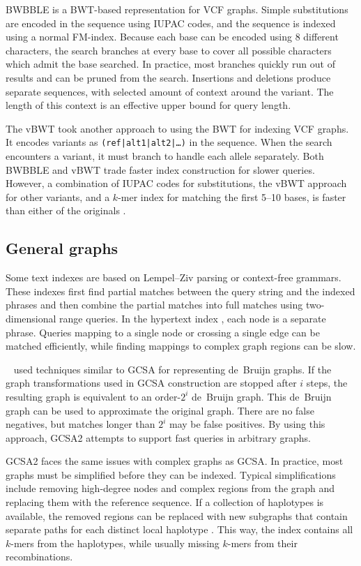 BWBBLE \cite{Huang_2013} is a BWT-based representation for VCF graphs.
Simple substitutions are encoded in the sequence using IUPAC codes, and the sequence is indexed using a normal FM-index.
Because each base can be encoded using 8 different characters, the search branches at every base to cover all possible characters which admit the base searched.
In practice, most branches quickly run out of results and can be pruned from the search.
Insertions and deletions produce separate sequences, with selected amount of context around the variant.
The length of this context is an effective upper bound for query length.

The vBWT \cite{Maciuca_2016} took another approach to using the BWT for indexing VCF graphs.
It encodes variants as \texttt{(ref|alt1|alt2|\dots)} in the sequence.
When the search encounters a variant, it must branch to handle each allele separately.
Both BWBBLE and vBWT trade faster index construction for slower queries.
However, a combination of IUPAC codes for substitutions, the vBWT approach for other variants, and a $k$-mer index for matching the first 5--10 bases, is faster than either of the originals \cite{Buechler_2019}.

\subsection{General graphs}

Some text indexes are based on Lempel--Ziv parsing or context-free grammars.
These indexes first find partial matches between the query string and the indexed phrases and then combine the partial matches into full matches using two-dimensional range queries.
In the hypertext index \cite{Thachuk_2013}, each node is a separate phrase.
Queries mapping to a single node or crossing a single edge can be matched efficiently, while finding mappings to complex graph regions can be slow.

\citeauthor{Bowe_2012}\ \cite{Bowe_2012} used techniques similar to GCSA for representing de~Bruijn graphs.
If the graph transformations used in GCSA construction are stopped after $i$ steps, the resulting graph is equivalent to an order-$2^{i}$ de~Bruijn graph.
This de~Bruijn graph can be used to approximate the original graph.
There are no false negatives, but matches longer than $2^{i}$ may be false positives.
By using this approach, GCSA2 \cite{Siren_2017} attempts to support fast queries in arbitrary graphs.

GCSA2 faces the same issues with complex graphs as GCSA.
In practice, most graphs must be simplified before they can be indexed.
Typical simplifications include removing high-degree nodes and complex regions from the graph and replacing them with the reference sequence.
If a collection of haplotypes is available, the removed regions can be replaced with new subgraphs that contain separate paths for each distinct local haplotype \cite{Siren_2019}.
This way, the index contains all $k$-mers from the haplotypes, while usually missing $k$-mers from their recombinations.

